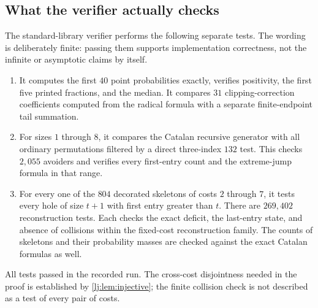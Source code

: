 \documentclass[11pt,a4paper]{article}
\theoremstyle{definition}\newaliascnt{definition}{theorem}
\theoremstyle{remark}\newaliascnt{remark}{theorem}
\begin{document}
\subsection{What the verifier actually checks}
The standard-library verifier performs the following separate tests.
The wording is deliberately finite: passing them supports implementation
correctness, not the infinite or asymptotic claims by itself.
\begin{enumerate}
\item It computes the first $40$ point probabilities exactly, verifies
positivity, the first five printed fractions, and the median. It compares
$31$ clipping-correction coefficients computed from the radical formula
with a separate finite-endpoint tail summation.
\item For sizes $1$ through $8$, it compares the Catalan recursive
generator with all ordinary permutations filtered by a direct three-index
$132$ test. This checks $2{,}055$ avoiders and verifies every first-entry
count and the extreme-jump formula in that range.
\item For every one of the $804$ decorated skeletons of costs $2$ through
$7$, it tests every hole of size $t+1$ with first entry greater than $t$.
There are $269{,}402$ reconstruction tests. Each checks the exact deficit,
the last-entry state, and absence of collisions within the fixed-cost
reconstruction family. The counts of skeletons and their probability
masses are checked against the exact Catalan formulas as well.
\end{enumerate}
All tests passed in the recorded run. The cross-cost disjointness needed
in the proof is established by \cref{lj:lem:injective}; the finite collision
check is not described as a test of every pair of costs.
\end{document}

